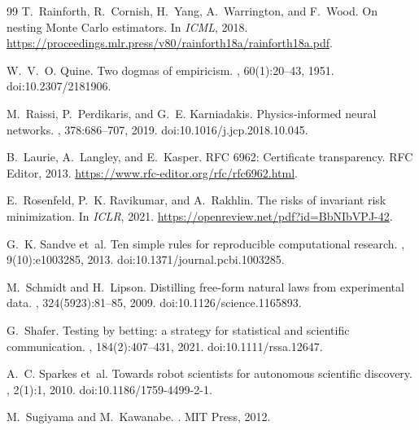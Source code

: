 \documentclass[11pt,a4paper]{article}
\begin{document}
\begin{thebibliography}{99}
T.~Rainforth, R.~Cornish, H.~Yang, A.~Warrington, and F.~Wood.
\newblock On nesting Monte Carlo estimators.
\newblock In {\em ICML}, 2018.
\newblock \url{https://proceedings.mlr.press/v80/rainforth18a/rainforth18a.pdf}.

W.~V.~O. Quine.
\newblock Two dogmas of empiricism.
, 60(1):20--43, 1951. doi:10.2307/2181906.

M.~Raissi, P.~Perdikaris, and G.~E. Karniadakis.
\newblock Physics-informed neural networks.
, 378:686--707, 2019. doi:10.1016/j.jcp.2018.10.045.

B.~Laurie, A.~Langley, and E.~Kasper.
\newblock RFC 6962: Certificate transparency.
\newblock RFC Editor, 2013.
\newblock \url{https://www.rfc-editor.org/rfc/rfc6962.html}.

E.~Rosenfeld, P.~K. Ravikumar, and A.~Rakhlin.
\newblock The risks of invariant risk minimization.
\newblock In {\em ICLR}, 2021.
\newblock \url{https://openreview.net/pdf?id=BbNIbVPJ-42}.

G.~K. Sandve et~al.
\newblock Ten simple rules for reproducible computational research.
, 9(10):e1003285, 2013. doi:10.1371/journal.pcbi.1003285.

M.~Schmidt and H.~Lipson.
\newblock Distilling free-form natural laws from experimental data.
, 324(5923):81--85, 2009. doi:10.1126/science.1165893.

G.~Shafer.
\newblock Testing by betting: a strategy for statistical and scientific communication.
, 184(2):407--431, 2021. doi:10.1111/rssa.12647.

A.~C. Sparkes et~al.
\newblock Towards robot scientists for autonomous scientific discovery.
, 2(1):1, 2010. doi:10.1186/1759-4499-2-1.

M.~Sugiyama and M.~Kawanabe.
.
\newblock MIT Press, 2012.


\end{thebibliography}
\end{document}
